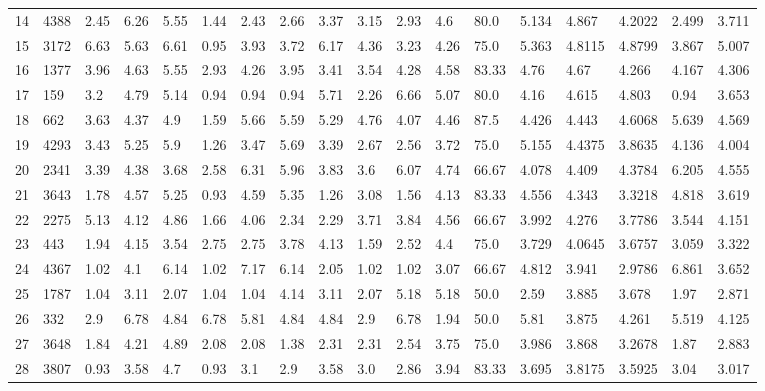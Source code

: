 \documentclass[landscape, 10pt]{report}
\begin{document}
\begin{longtable}{l || l || l | l | l | l | l | l | l | l | l | l | l || l | l | l | l | l}
14 & 4388 & 2.45 & 6.26 & 5.55 & 1.44 & 2.43 & 2.66 & 3.37 & 3.15 & 2.93 & 4.6 & 80.0 & 5.134 & 4.867 & 4.2022 & 2.499 & 3.711\\ 
\rowcolor{lightgray}15 & 3172 & 6.63 & 5.63 & 6.61 & 0.95 & 3.93 & 3.72 & 6.17 & 4.36 & 3.23 & 4.26 & 75.0 & 5.363 & 4.8115 & 4.8799 & 3.867 & 5.007\\ 
16 & 1377 & 3.96 & 4.63 & 5.55 & 2.93 & 4.26 & 3.95 & 3.41 & 3.54 & 4.28 & 4.58 & 83.33 & 4.76 & 4.67 & 4.266 & 4.167 & 4.306\\ 
\rowcolor{lightgray}17 & 159 & 3.2 & 4.79 & 5.14 & 0.94 & 0.94 & 0.94 & 5.71 & 2.26 & 6.66 & 5.07 & 80.0 & 4.16 & 4.615 & 4.803 & 0.94 & 3.653\\ 
18 & 662 & 3.63 & 4.37 & 4.9 & 1.59 & 5.66 & 5.59 & 5.29 & 4.76 & 4.07 & 4.46 & 87.5 & 4.426 & 4.443 & 4.6068 & 5.639 & 4.569\\ 
\rowcolor{lightgray}19 & 4293 & 3.43 & 5.25 & 5.9 & 1.26 & 3.47 & 5.69 & 3.39 & 2.67 & 2.56 & 3.72 & 75.0 & 5.155 & 4.4375 & 3.8635 & 4.136 & 4.004\\ 
20 & 2341 & 3.39 & 4.38 & 3.68 & 2.58 & 6.31 & 5.96 & 3.83 & 3.6 & 6.07 & 4.74 & 66.67 & 4.078 & 4.409 & 4.3784 & 6.205 & 4.555\\ 
\rowcolor{lightgray}21 & 3643 & 1.78 & 4.57 & 5.25 & 0.93 & 4.59 & 5.35 & 1.26 & 3.08 & 1.56 & 4.13 & 83.33 & 4.556 & 4.343 & 3.3218 & 4.818 & 3.619\\ 
22 & 2275 & 5.13 & 4.12 & 4.86 & 1.66 & 4.06 & 2.34 & 2.29 & 3.71 & 3.84 & 4.56 & 66.67 & 3.992 & 4.276 & 3.7786 & 3.544 & 4.151\\ 
\rowcolor{lightgray}23 & 443 & 1.94 & 4.15 & 3.54 & 2.75 & 2.75 & 3.78 & 4.13 & 1.59 & 2.52 & 4.4 & 75.0 & 3.729 & 4.0645 & 3.6757 & 3.059 & 3.322\\ 
24 & 4367 & 1.02 & 4.1 & 6.14 & 1.02 & 7.17 & 6.14 & 2.05 & 1.02 & 1.02 & 3.07 & 66.67 & 4.812 & 3.941 & 2.9786 & 6.861 & 3.652\\ 
\rowcolor{lightgray}25 & 1787 & 1.04 & 3.11 & 2.07 & 1.04 & 1.04 & 4.14 & 3.11 & 2.07 & 5.18 & 5.18 & 50.0 & 2.59 & 3.885 & 3.678 & 1.97 & 2.871\\ 
26 & 332 & 2.9 & 6.78 & 4.84 & 6.78 & 5.81 & 4.84 & 4.84 & 2.9 & 6.78 & 1.94 & 50.0 & 5.81 & 3.875 & 4.261 & 5.519 & 4.125\\ 
\rowcolor{lightgray}27 & 3648 & 1.84 & 4.21 & 4.89 & 2.08 & 2.08 & 1.38 & 2.31 & 2.31 & 2.54 & 3.75 & 75.0 & 3.986 & 3.868 & 3.2678 & 1.87 & 2.883\\ 
28 & 3807 & 0.93 & 3.58 & 4.7 & 0.93 & 3.1 & 2.9 & 3.58 & 3.0 & 2.86 & 3.94 & 83.33 & 3.695 & 3.8175 & 3.5925 & 3.04 & 3.017\\ 

\end{longtable}
\end{document}
